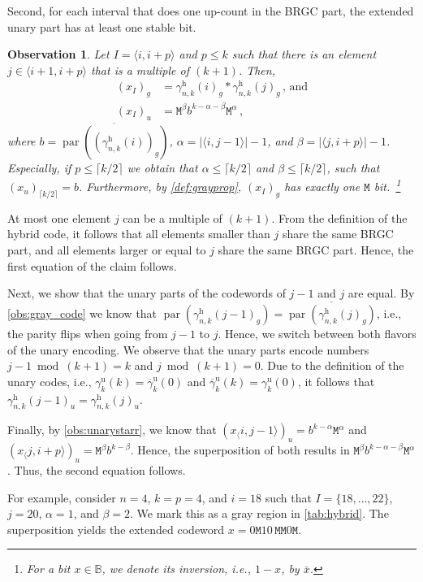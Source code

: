 \documentclass[9pt,journal,compsoc]{IEEEtran}
\newtheorem{observation}[theorem]{Observation}
\theoremstyle{remark}
\DeclareMathOperator{\parity}{par}
\newcommand{\starr}{*}
\newcommand{\mfu}{\mathtt{M}}
\newcommand{\IB}{\mathbb{B}}
\newcommand{\ceil}[1]{\lceil{#1}\rceil}
\newcommand{\ang}[1]{\langle{#1}\rangle}
\newcommand{\intvl}[1]{\ang{#1}}
\newcommand{\gUnary}[1]{\gamma_{#1}^{\operatorname{u}}}
\newcommand{\gbUnary}[1]{\overline{\gamma}_{#1}^{\operatorname{u}}}
\newcommand{\gHyb}[1]{\gamma_{#1}^{\operatorname{h}}}
\begin{document}
Second, for each interval that does one up-count in the BRGC part, the extended unary part has at least one stable bit.
\begin{observation}\label{obs:twocolumn}
  Let $I=\intvl{i,i+p}$ and $p\leq k$ such that
    there is an element $j\in\intvl{i+1,i+p}$ that is a multiple of $(k+1)$.
  Then,   
  \begin{align*}
    (x_I)_g &= \gHyb{n,k}(i)_g \starr \gHyb{n,k}(j)_g\,\text{, and}\\
    (x_I)_u &= \mfu^\beta b^{k-\alpha-\beta} \mfu^\alpha\,,
  \end{align*}
  where $b=\overline{\parity((\gHyb{n,k}(i))_g)}$,
    $\alpha=|\intvl{i,j-1}|-1$, and $\beta=|\intvl{j,i+p}|-1$.
	Especially, if $p\leq\ceil{k/2}$ we obtain that $\alpha\leq\ceil{k/2}$ and $\beta\leq\ceil{k/2}$,
    such that $(x_u)_{\ceil{k/2}}=b$.
  Furthermore, by \cref{def:grayprop}, $(x_I)_g$ has exactly one $\mfu$ bit.~\footnote{For a bit $x \in \IB$, we denote its inversion, i.e., $1 - x$, by $\bar{x}$.} %
\end{observation}
\begin{IEEEproof}
  At most one element $j$ can be a multiple of $(k+1)$.
  From the definition of the hybrid code, it follows that all elements 
    smaller than $j$ share the same BRGC part, and
    all elements larger or equal to $j$ share the same BRGC part. 
  Hence, the first equation of the claim follows.

  Next, we show that the unary parts of the codewords of $j-1$ and $j$
    are equal.
  By \cref{obs:gray_code} we know that $\parity(\gHyb{n,k}(j-1)_g)=
    \overline{\parity(\gHyb{n,k}(j)_g)}$, i.e.,
    the parity flips when going from $j-1$ to $j$.
  Hence, we switch between both flavors of the unary encoding.
  We observe that the unary parts encode numbers $j-1 \bmod (k+1) = k$ 
    and $j \bmod (k+1)=0$.
  Due to the definition of the unary codes, i.e., $\gUnary{k}(k)=\gbUnary{k}(0)$ 
    and $\gbUnary{k}(k)=\gUnary{k}(0)$, it follows that
    $\gHyb{n,k}(j-1)_u=\gHyb{n,k}(j)_u$.

  Finally, by \cref{obs:unarystarr}, we know that 
    $(x_\intvl{i,j-1})_u=b^{k-\alpha}\mfu^{\alpha}$ and
    $(x_\intvl{j,i+p})_u=\mfu^{\beta}b^{k-\beta}$. 
  Hence, the superposition of both results in $\mfu^\beta b^{k-\alpha-\beta} \mfu^\alpha$. 
  Thus, the second equation follows.
\end{IEEEproof}

For example, consider $n=4$, $k=p=4$, and $i=18$ such that $I=\{18,\ldots, 22\}$, $j=20$, $\alpha=1$, and $\beta=2$.
We mark this as a gray region in \cref{tab:hybrid}.
The superposition yields the extended codeword $x=0\mfu10\,\mfu\mfu0\mfu$.
\end{document}
